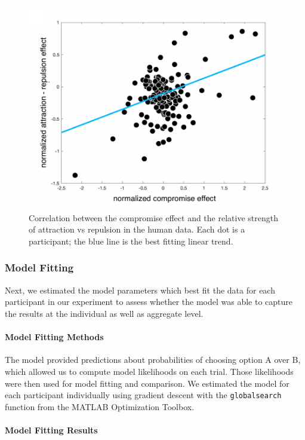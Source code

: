 \documentclass[a4paper, nobind]{templates/ociamthesis}
\begin{document}
\begin{figure}

{\centering \includegraphics[width=0.5\linewidth]{figures/decoy-new-rel} 

}

\caption[New decoy relationship]{Correlation between the compromise effect and the relative strength of attraction vs repulsion in the human data.  Each dot is a participant; the blue line is the best fitting linear trend.}\label{fig:decoy-new-rel}
\end{figure}

\hypertarget{model-fitting}{%
\subsubsection{Model Fitting}\label{model-fitting}}

Next, we estimated the model parameters which best fit the data for each participant in our experiment to assess whether the model was able to capture the results at the individual as well as aggregate level.

\hypertarget{model-fitting-methods}{%
\paragraph{Model Fitting Methods}\label{model-fitting-methods}}

The model provided predictions about probabilities of choosing option A over B, which allowed us to compute model likelihoods on each trial. Those likelihoods were then used for model fitting and comparison. We estimated the model for each participant individually using gradient descent with the \texttt{globalsearch} function from the MATLAB Optimization Toolbox.

\hypertarget{model-fitting-results}{%
\paragraph{Model Fitting Results}\label{model-fitting-results}}
\end{document}
